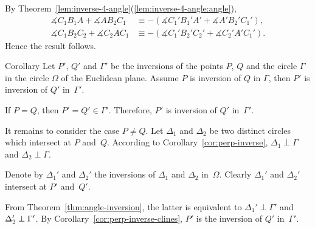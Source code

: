 By Theorem~\ref{lem:inverse-4-angle}(\ref{lem:inverse-4-angle:angle}),
\begin{align*}
\measuredangle C_1B_1A+\measuredangle AB_2 C_1&\equiv-(\measuredangle C_1'B_1'A'+\measuredangle A'B_2' C_1'),
\\
\measuredangle C_1B_2C_2 +\measuredangle C_2 A C_1&\equiv-(\measuredangle C_1'B_2'C_2' +\measuredangle C_2' A' C_1').
\end{align*}
Hence the result follows.\qeds




\begin{thm}{Corollary}\label{cor:invese-comp}
Let $P'$, $Q'$ and $\Gamma'$ 
be the inversions of the points $P$, $Q$ and the circle $\Gamma$ in the circle $\Omega$ of the Euclidean plane.
Assume $P$ is inversion of $Q$ in $\Gamma$, 
then $P'$ is inversion of $Q'$ in~$\Gamma'$.
\end{thm}

If $P=Q$, 
then $P'=Q'\in\Gamma'$. 
Therefore, $P'$ is inversion of $Q'$ in~$\Gamma'$.

It remains to consider the case $P\ne Q$. 
Let $\Delta_1$ and $\Delta_2$ be two distinct circles which intersect at $P$ and~$Q$.
According to Corollary~\ref{cor:perp-inverse}, 
$\Delta_1\perp\Gamma$ and $\Delta_2\perp\Gamma$.

Denote by $\Delta_1'$ and $\Delta_2'$ the inversions of $\Delta_1$ and $\Delta_2$ in~$\Omega$.
Clearly $\Delta_1'$ and $\Delta_2'$ intersect at $P'$ and~$Q'$.

From Theorem~\ref{thm:angle-inversion}, 
the latter is equivalent 
to $\Delta_1'\perp\Gamma'$ and $\Delta_2'\z\perp\Gamma'$.
By Corollary~\ref{cor:perp-inverse-clines}, $P'$ is the inversion of $Q'$ in~$\Gamma'$.
\qeds

